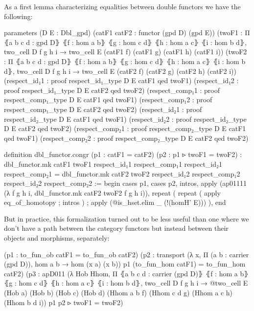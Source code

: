 As a first lemma characterizing equalities between double functors we have the
following:

\begin{leancodebr}
  parameters (D E : Dbl_gpd)
    (catF1 catF2 : functor (gpd D) (gpd E))
    (twoF1 : Π ⦃a b c d : gpd D⦄
      ⦃f : hom a b⦄ ⦃g : hom c d⦄ ⦃h : hom a c⦄ ⦃i : hom b d⦄,
      two_cell D f g h i → two_cell E (catF1 f) (catF1 g) (catF1 h) (catF1 i))
    (twoF2 : Π ⦃a b c d : gpd D⦄
      ⦃f : hom a b⦄ ⦃g : hom c d⦄ ⦃h : hom a c⦄ ⦃i : hom b d⦄,
      two_cell D f g h i → two_cell E (catF2 f) (catF2 g) (catF2 h) (catF2 i))
    (respect_id₁1 : proof respect_id₁_type D E catF1 qed twoF1)
    (respect_id₁2 : proof respect_id₁_type D E catF2 qed twoF2)
    (respect_comp₁1 : proof respect_comp₁_type D E catF1 qed twoF1)
    (respect_comp₁2 : proof respect_comp₁_type D E catF2 qed twoF2)
    (respect_id₂1 : proof respect_id₂_type D E catF1 qed twoF1)
    (respect_id₂2 : proof respect_id₂_type D E catF2 qed twoF2)
    (respect_comp₂1 : proof respect_comp₂_type D E catF1 qed twoF1)
    (respect_comp₂2 : proof respect_comp₂_type D E catF2 qed twoF2) 

  definition dbl_functor.congr (p1 : catF1 = catF2) (p2 : p1 ▹ twoF1 = twoF2) :
    dbl_functor.mk catF1 twoF1 
      respect_id₁1 respect_comp₁1 respect_id₂1 respect_comp₂1
    = dbl_functor.mk catF2 twoF2 
      respect_id₁2 respect_comp₁2 respect_id₂2 respect_comp₂2 :=
  begin
    cases p1, cases p2,
    intros, apply (ap01111 (λ f g h i, dbl_functor.mk catF2 twoF2 f g h i)),
      repeat (
        repeat ( apply eq_of_homotopy ; intros ) ;
        apply (@is_hset.elim _ (!(homH' E))) ),
  end
\end{leancodebr}

But in practice, this formalization turned out to be less useful than one where
we don't have a path between the category functors but instead between their
objects and morphisms, separately:
\begin{leancodebr}
    (p1 : to_fun_ob catF1 = to_fun_ob catF2)
    (p2 : transport
      (λ x, Π (a b : carrier (gpd D)), hom a b → hom (x a) (x b)) p1
      (to_fun_hom catF1) = to_fun_hom catF2)
    (p3 : apD011 (λ Hob Hhom,
                  Π ⦃a b c d : carrier (gpd D)⦄
                    ⦃f : hom a b⦄ ⦃g : hom c d⦄ ⦃h : hom a c⦄ ⦃i : hom b d⦄,
                    two_cell D f g h i →
                    @two_cell E (Hob a) (Hob b) (Hob c) (Hob d)
                     (Hhom a b f) (Hhom c d g) (Hhom a c h) (Hhom b d i))
          p1 p2 ▹ twoF1 = twoF2)
\end{leancodebr}

